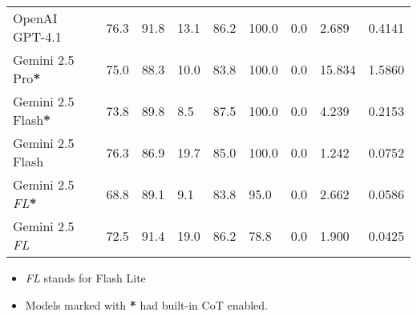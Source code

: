 \begin{table}[H]
\begin{tabularx}{\textwidth}{Xp{1.1cm}p{1.25cm}p{1.6cm}p{1.3cm}p{1.3cm}p{1.3cm}p{1.3cm}p{1.3cm}}
        \rowcolor[gray]{0.9}
        OpenAI GPT-4.1                   & 76.3                        & 91.8                            & 13.1                   & 86.2                   & 100.0                    & 0.0               & 2.689                         & 0.4141                           \\
        Gemini 2.5 Pro\textbf{*}         & 75.0                        & 88.3                            & 10.0                   & 83.8                   & 100.0                    & 0.0               & 15.834                        & 1.5860                           \\
        \rowcolor[gray]{0.9}
        Gemini 2.5 Flash\textbf{*}       & 73.8                        & 89.8                            & 8.5                    & 87.5                   & 100.0                    & 0.0               & 4.239                         & 0.2153                           \\
        Gemini 2.5 Flash                 & 76.3                        & 86.9                            & 19.7                   & 85.0                   & 100.0                    & 0.0               & 1.242                         & 0.0752                           \\
        \rowcolor[gray]{0.9}
        Gemini 2.5 \textit{FL}\textbf{*} & 68.8                        & 89.1                            & 9.1                    & 83.8                   & 95.0                     & 0.0               & 2.662                         & 0.0586                           \\
        Gemini 2.5 \textit{FL}           & 72.5                        & 91.4                            & 19.0                   & 86.2                   & 78.8                     & 0.0               & 1.900                         & 0.0425                           \\
        \bottomrule
    \end{tabularx}

    \begin{itemize}
        \footnotesize
        \item \textit{FL} stands for Flash Lite
        \item Models marked with \textbf{*} had built-in CoT enabled.
    \end{itemize}
\end{table}

